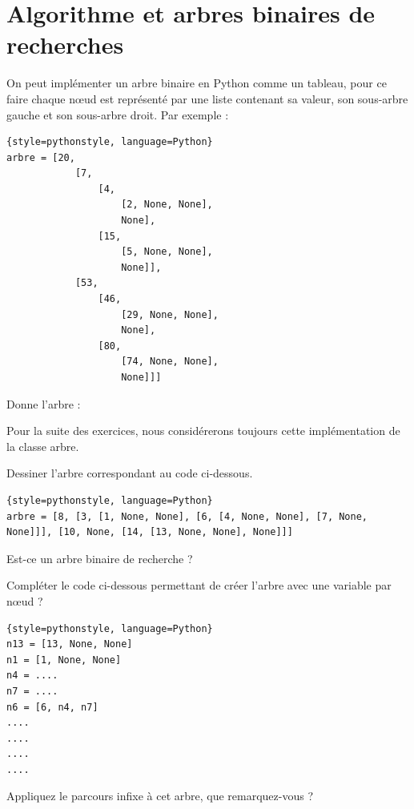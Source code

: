 \setcounter{Exercise}{0}

\section*{Algorithme et arbres binaires de recherches}
On peut implémenter un arbre binaire en Python comme un tableau, pour ce faire chaque nœud est représenté par une liste contenant sa valeur, son sous-arbre gauche et son sous-arbre droit.
Par exemple :
\begin{lstlisting}{style=pythonstyle, language=Python}
arbre = [20, 
            [7, 
                [4,
                    [2, None, None],
                    None],
                [15,
                    [5, None, None],
                    None]],
            [53,
                [46,
                    [29, None, None],
                    None],
                [80,
                    [74, None, None],
                    None]]]            
\end{lstlisting}
Donne l'arbre :
\begin{center}
    
\end{center}
Pour la suite des exercices, nous considérerons toujours cette implémentation de la classe arbre.

\begin{Exercise}[title={Dessinons}]

\Question Dessiner l'arbre correspondant au code ci-dessous.\\
\emptybox{5cm}
\begin{lstlisting}{style=pythonstyle, language=Python}
arbre = [8, [3, [1, None, None], [6, [4, None, None], [7, None, None]]], [10, None, [14, [13, None, None], None]]]
\end{lstlisting}

\Question Est-ce un arbre binaire de recherche ?

\Question Compléter le code ci-dessous permettant de créer l'arbre avec une variable par nœud  ?\\
\begin{lstlisting}{style=pythonstyle, language=Python}
n13 = [13, None, None]
n1 = [1, None, None]
n4 = ....
n7 = ....
n6 = [6, n4, n7]
....
....
....
....
\end{lstlisting}

\Question Appliquez le parcours infixe à cet arbre, que remarquez-vous  ?\\
\emptybox{1cm}
\end{Exercise}

